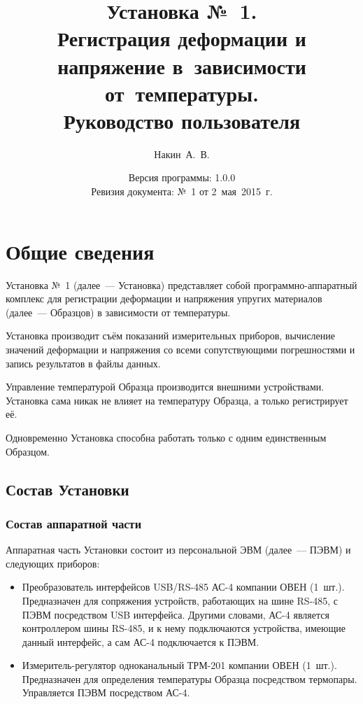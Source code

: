 \documentclass[12pt, a4paper, twocolumn]{report}
\title{Установка №~1. \\ Регистрация деформации и напряжение в~зависимости от~температуры. \\ Руководство пользователя}
\author{Накин~А.~В.}
\date{Версия программы: 1.0.0\\Ревизия документа: №~1 от \mbox{2 мая 2015~г.}}
\begin{document}
\maketitle

\tableofcontents

\chapter{Общие сведения}

Установка №~1 (далее~--- Установка) представляет собой программно-аппаратный комплекс для регистрации деформации и напряжения упругих материалов (далее~--- Образцов) в зависимости от температуры.

Установка производит съём показаний измерительных приборов, вычисление значений деформации и напряжения со всеми сопутствующими погрешностями и запись результатов в файлы данных.

Управление температурой Образца производится внешними устройствами. Установка сама никак не влияет на температуру Образца, а только регистрирует её.

Одновременно Установка способна работать только с одним единственным Образцом.

\section{Состав Установки}

\subsection{Состав аппаратной части}

Аппаратная часть Установки состоит из персональной ЭВМ (далее~--- ПЭВМ) и следующих приборов:

\begin{itemize}

\item Преобразователь интерфейсов USB/RS-485 АС-4 компании ОВЕН (1~шт.). Предназначен для сопряжения устройств, работающих на шине RS-485, с  ПЭВМ посредством USB интерфейса. Другими словами, АС-4 является контроллером шины RS-485, и к нему подключаются устройства, имеющие данный интерфейс, а сам АС-4 подключается к ПЭВМ.

\item Измеритель-регулятор одноканальный ТРМ-201 компании ОВЕН (1~шт.). Предназначен для определения температуры Образца посредством термопары. Управляется ПЭВМ посредством АС-4.

\end{itemize}
\end{document}
